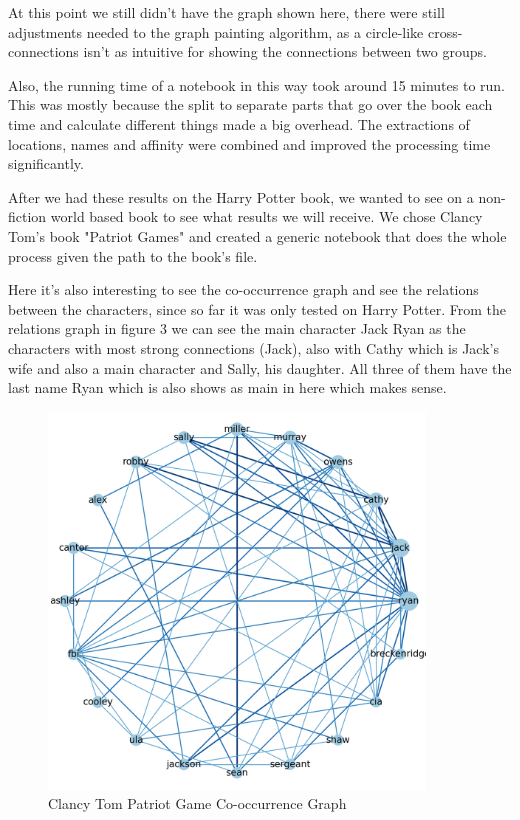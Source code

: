 \documentclass{article}
\begin{document}
At this point we still didn't have the graph shown here, there were still adjustments needed to the graph painting algorithm, as a circle-like cross-connections isn't as intuitive for showing the connections between two groups.

Also, the running time of a notebook in this way took around 15 minutes to run. This was mostly because the split to separate parts that go over the book each time and calculate different things made a big overhead. The extractions of locations, names and affinity were combined and improved the processing time significantly.

After we had these results on the Harry Potter book, we wanted to see on a non-fiction world based book to see what results we will receive. We chose Clancy Tom's book "Patriot Games" and created a generic notebook that does the whole process given the path to the book's file.

Here it's also interesting to see the co-occurrence graph and see the relations between the characters, since so far it was only tested on Harry Potter. From the relations graph in figure 3 we can see the main character Jack Ryan as the characters with most strong connections (Jack), also with Cathy which is Jack's wife and also a main character and Sally, his daughter. All three of them have the last name Ryan which is also shows as main in here which makes sense.
\begin{figure}[h]
  \centering
  \includegraphics[width=10cm]{Tom Clancy co-occurrence graph.png}
  \caption{Clancy Tom Patriot Game Co-occurrence Graph}
  \label{fig3}
\end{figure}
\end{document}
